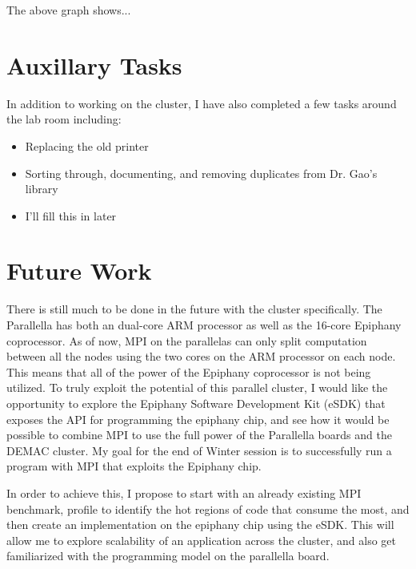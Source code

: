 \documentclass[letterpaper,12pt]{article}
\begin{document}
The above graph shows...

\section{Auxillary Tasks}
In addition to working on the cluster, I have also completed a few tasks around the lab room including:
\begin{itemize}
\item Replacing the old printer
\item Sorting through, documenting, and removing duplicates from Dr. Gao's library
\item I'll fill this in later
\end{itemize}

\clearpage

\section{Future Work}

    There is still much to be done in the future with the cluster specifically. The Parallella has both an dual-core ARM processor as well as the 16-core Epiphany coprocessor. As of now, MPI on the parallelas can only split computation between all the nodes using the two cores on the ARM processor on each node. This means that all of the power of the Epiphany coprocessor is not being utilized. To truly exploit the potential of this parallel cluster, I would like the opportunity to explore the Epiphany Software Development Kit (eSDK) that exposes the API for programming the epiphany chip, and see how it would be possible to combine MPI to use the full power of the Parallella boards and the DEMAC cluster. My goal for the end of Winter session is to successfully run a program with MPI that exploits the Epiphany chip.

In order to achieve this, I propose to start with an already existing MPI benchmark, profile to identify the hot regions of code that consume the most, and then create an implementation on the epiphany chip using the eSDK. This will allow me to explore scalability of an application across the cluster, and also get familiarized with the programming model on the parallella board.
\end{document}
